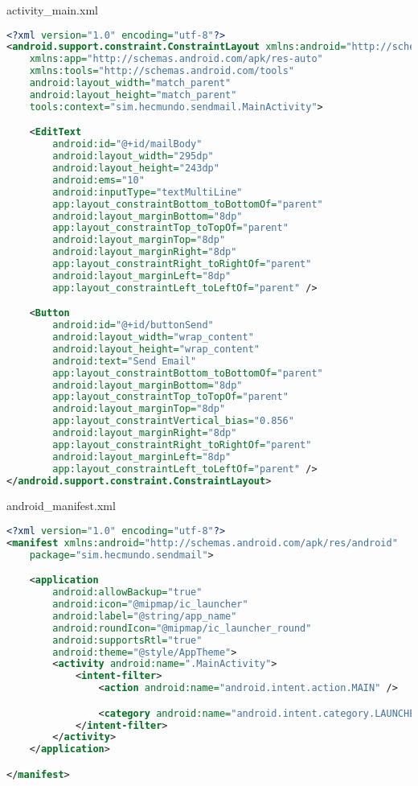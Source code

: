 \documentclass{report}
\begin{document}
activity\_main.xml
\begin{lstlisting}[language=xml]
<?xml version="1.0" encoding="utf-8"?>
<android.support.constraint.ConstraintLayout xmlns:android="http://schemas.android.com/apk/res/android"
    xmlns:app="http://schemas.android.com/apk/res-auto"
    xmlns:tools="http://schemas.android.com/tools"
    android:layout_width="match_parent"
    android:layout_height="match_parent"
    tools:context="sim.hecmundo.sendmail.MainActivity">

    <EditText
        android:id="@+id/mailBody"
        android:layout_width="295dp"
        android:layout_height="243dp"
        android:ems="10"
        android:inputType="textMultiLine"
        app:layout_constraintBottom_toBottomOf="parent"
        android:layout_marginBottom="8dp"
        app:layout_constraintTop_toTopOf="parent"
        android:layout_marginTop="8dp"
        android:layout_marginRight="8dp"
        app:layout_constraintRight_toRightOf="parent"
        android:layout_marginLeft="8dp"
        app:layout_constraintLeft_toLeftOf="parent" />

    <Button
        android:id="@+id/buttonSend"
        android:layout_width="wrap_content"
        android:layout_height="wrap_content"
        android:text="Send Email"
        app:layout_constraintBottom_toBottomOf="parent"
        android:layout_marginBottom="8dp"
        app:layout_constraintTop_toTopOf="parent"
        android:layout_marginTop="8dp"
        app:layout_constraintVertical_bias="0.856"
        android:layout_marginRight="8dp"
        app:layout_constraintRight_toRightOf="parent"
        android:layout_marginLeft="8dp"
        app:layout_constraintLeft_toLeftOf="parent" />
</android.support.constraint.ConstraintLayout>
\end{lstlisting}

android\_manifest.xml
\begin{lstlisting}[language=xml]
<?xml version="1.0" encoding="utf-8"?>
<manifest xmlns:android="http://schemas.android.com/apk/res/android"
    package="sim.hecmundo.sendmail">

    <application
        android:allowBackup="true"
        android:icon="@mipmap/ic_launcher"
        android:label="@string/app_name"
        android:roundIcon="@mipmap/ic_launcher_round"
        android:supportsRtl="true"
        android:theme="@style/AppTheme">
        <activity android:name=".MainActivity">
            <intent-filter>
                <action android:name="android.intent.action.MAIN" />

                <category android:name="android.intent.category.LAUNCHER" />
            </intent-filter>
        </activity>
    </application>

</manifest>
\end{lstlisting}
\end{document}
